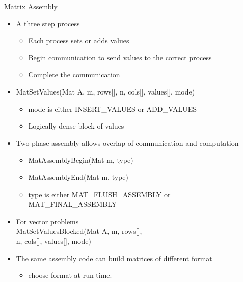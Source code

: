 \begin{frame}{Matrix Assembly}

\begin{itemize}
  \item A three step process
  \begin{itemize}
    \item Each process sets or adds values
    \item Begin communication to send values to the correct process
    \item Complete the communication
  \end{itemize}
  \item {\kb MatSetValues(Mat A, m, rows[], n, cols[], values[], mode)}
  \begin{itemize}
    \item {\kb mode} is either INSERT\_VALUES or ADD\_VALUES
    \item Logically dense block of values
  \end{itemize}
  \item Two phase assembly allows overlap of communication and computation
  \begin{itemize}
    \item {\kb MatAssemblyBegin(Mat m, type)}
    \item {\kb MatAssemblyEnd(Mat m, type)}
    \item {\kb type} is either MAT\_FLUSH\_ASSEMBLY or MAT\_FINAL\_ASSEMBLY
  \end{itemize}
  \item<2-> For vector problems\\
    {\kb MatSetValuesBlocked(Mat A, m, rows[], \\
      \qquad\qquad n, cols[], values[], mode)}
  \item<2-> The same assembly code can build matrices of different format
    \begin{itemize}
    \item choose format at run-time.
    \end{itemize}
\end{itemize}

\end{frame}
